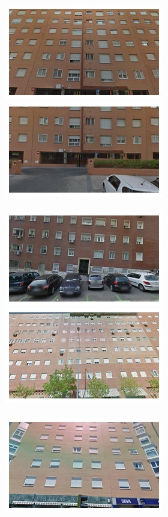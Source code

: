 \begin{figure}[t]
\begin{minipage}{\linewidth}
\begin{minipage}{0.3\linewidth}
      \includegraphics[width=0.49\linewidth]{imgs/arch/mosaicsS3/mosaic0002.jpg}
      \includegraphics[width=0.49\linewidth]{imgs/arch/mosaicsS3/mosaic0003.jpg}
      \\ \vspace{-3mm} \\
      \includegraphics[width=0.49\linewidth]{imgs/arch/mosaicsS3/mosaic0004.jpg}
      \includegraphics[width=0.49\linewidth]{imgs/arch/mosaicsS3/mosaic0005.jpg}
      \\ \vspace{-3mm} \\
      \includegraphics[width=0.49\linewidth]{imgs/arch/mosaicsS3/mosaic0006.jpg}

\end{minipage}
\end{minipage}
\end{figure}
